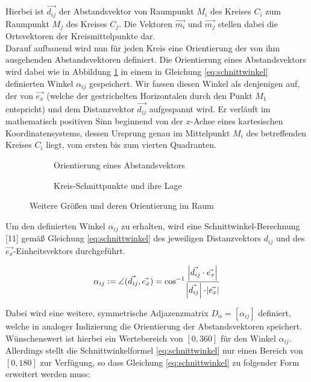 \documentclass[accentcolor=tud1c, 11pt, toc=bib, toc=listof, captions=abovetable, parskip=half]{tudreport}
\begin{document}
Hierbei ist $\vec{d_{ij}}$ der Abstandsvektor von Raumpunkt $M_i$ des Kreises $C_i$ zum Raumpunkt $M_j$ des Kreises $C_j$. Die Vektoren $\vec{m_i}$ und $\vec{m_j}$ stellen dabei die Ortsvektoren der Kreismittelpunkte dar.\\

Darauf aufbauend wird nun für jeden Kreis eine Orientierung der von ihm ausgehenden Abstandsvektoren definiert. Die Orientierung eines Abstandsvektors wird dabei wie in Abbildung \ref{fig:distanzVektorLage} in einem in Gleichung \ref{eq:schnittwinkel} definierten Winkel $\alpha_{ij}$ gespeichert. Wir fassen diesen Winkel als denjenigen auf, der von $\vec{e_x}$ (welche der gestrichelten Horizontalen durch den Punkt $M_1$ entspricht) und dem Distanzvektor $\vec{d_{ij}}$ aufgespannt wird. Er verläuft im mathematisch positiven Sinn beginnend von der $x$-Achse eines kartesischen Koordinatensystems, dessen Ursprung genau im Mittelpunkt $M_i$ des betreffenden Kreises $C_i$ liegt, vom ersten bis zum vierten Quadranten.\\

\begin{figure}[h!]
\begin{subfigure}[b]{0.5\textwidth}
\centering

\caption{Orientierung eines Abstandsvektors}
\label{fig:distanzVektorLage}
\end{subfigure}
\begin{subfigure}[b]{0.5\textwidth}
\centering

\caption{Kreis-Schnittpunkte und ihre Lage}
\label{fig:schnittWinkelLage}
\end{subfigure}
\caption{Weitere Größen und deren Orientierung im Raum}
\end{figure}

Um den definierten Winkel $\alpha_{ij}$ zu erhalten, wird eine Schnittwinkel-Berechnung [11] gemäß Gleichung \ref{eq:schnittwinkel}  des jeweiligen Distanzvektors $d_{ij}$ und des $\vec{e_x}$-Einheitsvektors durchgeführt.

\begin{equation} 
\alpha_{ij} := \angle(\vec{d_{ij}},\vec{e_x}) = \cos^{-1}{\frac{\abs{\vec{d_{ij}}\cdot\vec{e_x}}}{\abs{\vec{d_{ij}}}\cdot\abs{\vec{e_x}}}}
\label{eq:schnittwinkel}
\end{equation}

Dabei wird eine weitere, symmetrische  Adjazenzmatrix $D_\alpha = \left[ \alpha_{ij} \right] $ definiert, welche in analoger Indizierung die Orientierung der Abstandsvektoren speichert. Wünschenswert ist hierbei ein Wertebereich von $[0,360]$ für den Winkel $\alpha_{ij}$. Allerdings stellt die Schnittwinkelformel \ref{eq:schnittwinkel} nur einen Bereich von $[0,180]$ zur Verfügung, so dass Gleichung  \ref{eq:schnittwinkel} zu folgender Form erweitert werden muss:\\
\end{document}

